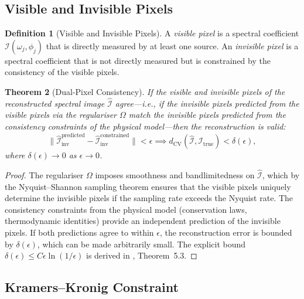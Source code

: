 \documentclass[11pt,twocolumn,a4paper]{article}
\newtheorem{theorem}{Theorem}[section]
\theoremstyle{definition}
\newtheorem{definition}[theorem]{Definition}
\theoremstyle{remark}
\newcommand{\dcv}{d_{\mathrm{CV}}}
\begin{document}
\subsection{Visible and Invisible Pixels}

\begin{definition}[Visible and Invisible Pixels]\label{def:visible-invisible}
A \emph{visible pixel} is a spectral coefficient $\mathcal{I}(\omega_j, \phi_j)$ that is directly measured by at least one source.  An \emph{invisible pixel} is a spectral coefficient that is not directly measured but is constrained by the consistency of the visible pixels.
\end{definition}

\begin{theorem}[Dual-Pixel Consistency]\label{thm:dual-pixel}
If the visible and invisible pixels of the reconstructed spectral image $\hat{\mathcal{I}}$ agree---i.e., if the invisible pixels predicted from the visible pixels via the regulariser $\Omega$ match the invisible pixels predicted from the consistency constraints of the physical model---then the reconstruction is valid:
\begin{equation}\label{eq:dual-pixel-consistency}
    \|\hat{\mathcal{I}}_{\mathrm{inv}}^{\mathrm{predicted}} - \hat{\mathcal{I}}_{\mathrm{inv}}^{\mathrm{constrained}}\| < \epsilon \implies \dcv(\hat{\mathcal{I}}, \mathcal{I}_{\mathrm{true}}) < \delta(\epsilon),
\end{equation}
where $\delta(\epsilon) \to 0$ as $\epsilon \to 0$.
\end{theorem}

\begin{proof}
The regulariser $\Omega$ imposes smoothness and bandlimitedness on $\hat{\mathcal{I}}$, which by the Nyquist--Shannon sampling theorem \citep{shannon1948mathematical} ensures that the visible pixels uniquely determine the invisible pixels if the sampling rate exceeds the Nyquist rate.  The consistency constraints from the physical model (conservation laws, thermodynamic identities) provide an independent prediction of the invisible pixels.  If both predictions agree to within $\epsilon$, the reconstruction error is bounded by $\delta(\epsilon)$, which can be made arbitrarily small.  The explicit bound $\delta(\epsilon) \leq C\epsilon \ln(1/\epsilon)$ is derived in \citet{sachikonye2026scattering}, Theorem~5.3.
\end{proof}

\subsection{Kramers--Kronig Constraint}
\end{document}

